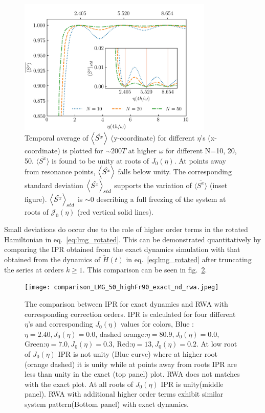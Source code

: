 \documentclass[%
reprint,
superscriptaddress,
amsmath,amssymb,
aps,
prb,
showkeys,
]{revtex4-2}
\begin{document}
\begin{figure}[t!]
	\centering
	\includegraphics[width=9.3cm]{sx_conservation.jpeg}
	\caption{Temporal average of $\expval{\hat{S^x}}$ (y-coordinate) for different $\eta$'s (x-coordinate) is plotted for $\sim 200T$ at higher $\omega$ for different N=10, 20, 50. $\overline{\langle S^x \rangle}$ is found to be unity at roots of $J_0(\eta)$. At points away from resonance points, $\expval{\hat{S^x}}$ falls below unity. The corresponding standard deviation $\expval{\hat{S^x}}_{std}$ supports the variation of $\overline{\langle S^x \rangle}$ (inset figure). $\expval{\hat{S^x}}_{std}$ is $\sim 0$ describing a full freezing of the system at roots of $\mathcal{J}_0(\eta)$ (red vertical solid lines).}
	\label{fig:sx_conserve}
\end{figure}
Small deviations do occur due to the role of  higher order terms in the rotated Hamiltonian in eq.~\ref{eq:lmg_rotated}. This can be demonstrated quantitatively by comparing the IPR obtained from the exact dynamics simulation with that obtained from the dynamics of $\tilde{H}(t)$ in eq.~\ref{eq:lmg_rotated} after truncating the series at orders $k\geq 1$. This comparison can be seen in fig.~\ref{fig:lmg_ipr_rwa11}.
\begin{figure}[t!]
	\centering
	\texttt{[image: comparison\_LMG\_50\_highFr90\_exact\_nd\_rwa.jpeg]}
	\caption{The comparison between IPR for exact dynamics and RWA with corresponding correction orders. IPR is calculated for four different $\eta$'s and corresponding $J_0(\eta)$ values for colors, Blue :$\eta = 2.40, J_0(\eta) = 0.0$, dashed orange:$\eta = 80.9, J_0(\eta) = 0.0$, Green:$\eta =7.0, J_0(\eta) = 0.3$, Red:$\eta = 13, J_0(\eta)= 0. 2$. At low root of $J_0(\eta)$ IPR is not unity (Blue curve) where at higher root (orange dashed) it is unity while at points away from roots IPR are less than unity in the exact (top panel) plot. RWA does not matches with the exact plot. At all roots of $J_0(\eta)$ IPR is unity(middle panel). RWA with additional higher order terms exhibit similar system pattern(Bottom panel) with exact dynamics.}
	\label{fig:lmg_ipr_rwa11}
\end{figure}
\end{document}
